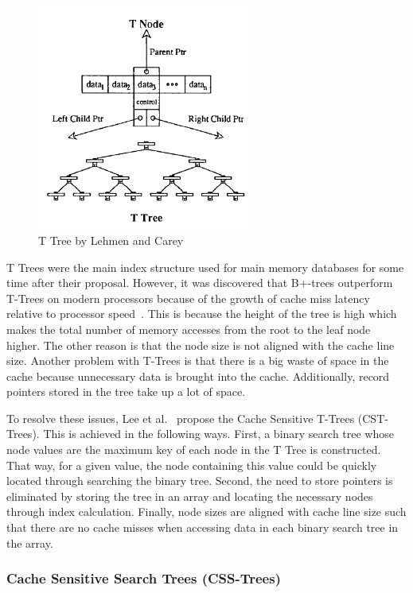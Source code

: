 \documentclass[12pt,a4paper]{article}
\begin{document}
\begin{figure}[!t]
\centering
\includegraphics[width=7cm]{figs/Ttree.png}
\caption{T Tree by Lehmen and Carey~\cite{lehman1986study}}
\label{fig:ttree}
\end{figure}

T Trees were the main index structure used for main memory databases for some time after their proposal. However, it was discovered that B+-trees outperform
T-Trees on modern processors because of the growth of cache miss latency relative to processor speed~\cite{rao1999cache,lee2007cst}. This is because the height
of the tree is high which makes the total number of memory accesses from the root to the leaf node higher. The other reason is that the node size is not aligned
with the cache line size. Another problem with T-Trees is that there is a big waste of space in the cache because unnecessary data is brought into the cache.
Additionally, record pointers stored in the tree take up a lot of space.

To resolve these issues, Lee et al.~\cite{lee2007cst} propose the Cache Sensitive T-Trees (CST-Trees). This is achieved in the following ways. First, a binary
search tree whose node values are the maximum key of each node in the T Tree is constructed. That way, for a given value, the node containing this value could
be quickly located through searching the binary tree. Second, the need to store pointers is eliminated by storing the tree in an array and locating the
necessary nodes through index calculation. Finally, node sizes are aligned with cache line size such that there are no cache misses when accessing data in each
binary search tree in the array.

\subsubsection*{Cache Sensitive Search Trees (CSS-Trees)}
\end{document}
